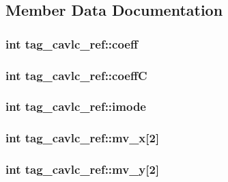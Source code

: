 \subsection{Member Data Documentation}
\hypertarget{structtag__cavlc__ref_a4fc396cd8d03fbd50466ff12a4785529}{
\subsubsection[{coeff}]{\setlength{\rightskip}{0pt plus 5cm}int {\bf tag\_\-cavlc\_\-ref::coeff}}}
\label{structtag__cavlc__ref_a4fc396cd8d03fbd50466ff12a4785529}
\hypertarget{structtag__cavlc__ref_a38397a4aa7f4f450d2bed25146783b22}{
\subsubsection[{coeffC}]{\setlength{\rightskip}{0pt plus 5cm}int {\bf tag\_\-cavlc\_\-ref::coeffC}}}
\label{structtag__cavlc__ref_a38397a4aa7f4f450d2bed25146783b22}
\hypertarget{structtag__cavlc__ref_a76c8b0c75a3a13a59196c89cf919766f}{
\subsubsection[{imode}]{\setlength{\rightskip}{0pt plus 5cm}int {\bf tag\_\-cavlc\_\-ref::imode}}}
\label{structtag__cavlc__ref_a76c8b0c75a3a13a59196c89cf919766f}
\hypertarget{structtag__cavlc__ref_a890a9186d3db3787c7a451e51f4fc0bf}{
\subsubsection[{mv\_\-x}]{\setlength{\rightskip}{0pt plus 5cm}int {\bf tag\_\-cavlc\_\-ref::mv\_\-x}\mbox{[}2\mbox{]}}}
\label{structtag__cavlc__ref_a890a9186d3db3787c7a451e51f4fc0bf}
\hypertarget{structtag__cavlc__ref_abae0c90668fedb380b2cc0773cfa351d}{
\subsubsection[{mv\_\-y}]{\setlength{\rightskip}{0pt plus 5cm}int {\bf tag\_\-cavlc\_\-ref::mv\_\-y}\mbox{[}2\mbox{]}}}
